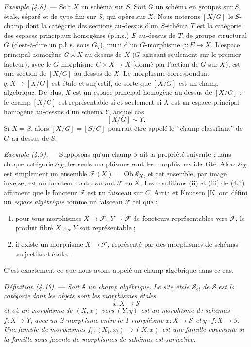 \documentclass[10pt]{article}
\begin{document}
\medskip
\noindent\emph{Exemple (4.8).} --- Soit $X$ un schéma sur $S$. Soit $G$ un schéma en groupes sur $S$, étale, séparé et de type fini sur $S$, qui opère sur $X$. Nous noterons $[X/G]$ le $S$-champ dont la catégorie des sections au-dessus d'un $S$-schéma $T$ est la catégorie des espaces principaux homogènes (p.h.s.) $E$ au-dessus de $T$, de groupe structural $G$ (c'est-à-dire un p.h.s. sous $G_T$), muni d'un $G$-morphisme $\varphi:E\to X$. L'espace principal homogène $G\times X$ au-dessus de $X$ ($G$ agissant seulement sur le premier facteur), avec le $G$-morphisme $G\times X\to X$ (donné par l'action de $G$ sur $X$), est une section de $[X/G]$ au-dessus de $X$. Le morphisme correspondant $q:X\to[X/G]$ est étale et surjectif, de sorte que $[X/G]$ est un champ algébrique. De plus, $X$ est un espace principal homogène au-dessus de $[X/G]$ ; le champ $[X/G]$ est représentable si et seulement si $X$ est un espace principal homogène au-dessus d'un schéma $Y$, auquel cas
\[
[X/G]\sim Y.
\]
Si $X=S$, alors $[X/G]=[S/G]$ pourrait être appelé le ``champ classifiant'' de $G$ au-dessus de $S$.

\medskip
\noindent\emph{Exemple (4.9).} --- Supposons qu'un champ $\mathscr S$ ait la propriété suivante : dans chaque catégorie $\mathscr S_X$, les seuls morphismes sont les morphismes identité. Alors $\mathscr S_X$ est simplement un ensemble $\mathscr F(X)=\operatorname{Ob}\mathscr S_X$, et cet ensemble, par image inverse, est un foncteur contravariant $\mathscr F$ en $X$. Les conditions (ii) et (iii) de (4.1) affirment que le foncteur $\mathscr F$ est un faisceau sur $C$. Artin et Knutson [K] ont défini un \emph{espace algébrique} comme un faisceau $\mathscr F$ tel que :
\begin{enumerate}[label=(\roman*)]
\item pour tous morphismes $X\to\mathscr F$, $Y\to\mathscr F$ de foncteurs représentables vers $\mathscr F$, le produit fibré $X\times_{\mathscr F}Y$ soit représentable ;
\item il existe un morphisme $X\to\mathscr F$, représenté par des morphismes de schémas surjectifs et étales.
\end{enumerate}
C'est exactement ce que nous avons appelé un champ algébrique dans ce cas.

\medskip
\noindent\emph{Définition (4.10).} --- \emph{Soit $\mathscr S$ un champ algébrique. Le site étale $\mathscr S_{et}$ de $\mathscr S$ est la catégorie dont les objets sont les morphismes étales}
\[
x:X\to\mathscr S
\]
\emph{et où un morphisme de $(X,x)$ vers $(Y,y)$ est un morphisme de schémas $f:X\to Y$, avec un 2-morphisme entre le 1-morphisme $x:X\to\mathscr S$ et $y\cdot f:X\to\mathscr S$. Une famille de morphismes $f_i:(X_i,x_i)\to(X,x)$ est une famille couvrante si la famille sous-jacente de morphismes de schémas est surjective.}
\end{document}
